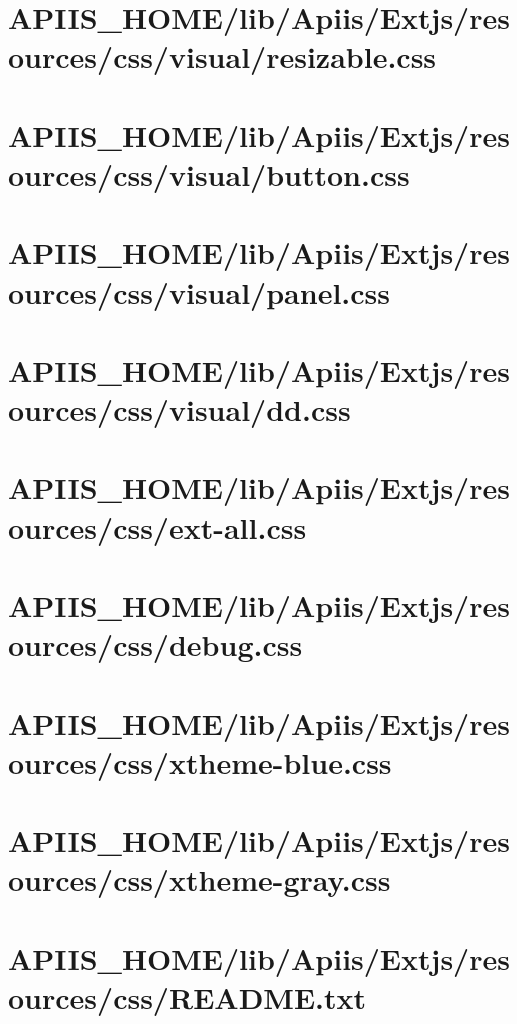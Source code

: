 \section{APIIS\_HOME/lib/Apiis/Extjs/resources/css/visual/resizable.css} 
\section{APIIS\_HOME/lib/Apiis/Extjs/resources/css/visual/button.css} 
\section{APIIS\_HOME/lib/Apiis/Extjs/resources/css/visual/panel.css} 
\section{APIIS\_HOME/lib/Apiis/Extjs/resources/css/visual/dd.css} 
\section{APIIS\_HOME/lib/Apiis/Extjs/resources/css/ext-all.css} 
\section{APIIS\_HOME/lib/Apiis/Extjs/resources/css/debug.css} 
\section{APIIS\_HOME/lib/Apiis/Extjs/resources/css/xtheme-blue.css} 
\section{APIIS\_HOME/lib/Apiis/Extjs/resources/css/xtheme-gray.css} 
\section{APIIS\_HOME/lib/Apiis/Extjs/resources/css/README.txt} 

